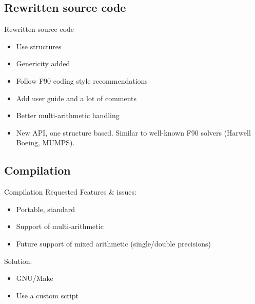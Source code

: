 \documentclass[slideopt,A4]{beamer}
\begin{document}
\subsection{Rewritten source code}
\begin{frame}{Rewritten source code}
\begin{minipage}{0.60 \textwidth}
\begin{itemize}
  \item Use structures
  \item Genericity added 
  \item Follow F90 coding style recommendations
  \item Add user guide and a lot of comments
  \item Better multi-arithmetic handling
  \item New API, one structure based. Similar to well-known F90 solvers (Harwell Boeing, MUMPS).
\end{itemize}
\end{minipage}
\end{frame}
%

%
\subsection{Compilation}
\begin{frame}{Compilation}
  Requested Features \& issues:
  \begin{itemize}
  \item Portable, standard
  \item Support of multi-arithmetic
  \item Future support of mixed arithmetic %
    (single/double precisions)
  \end{itemize}
  
  Solution:
  \begin{itemize}
  \item GNU/Make 
  \item Use a custom script
  \end{itemize}

\end{frame}
%
\end{document}
